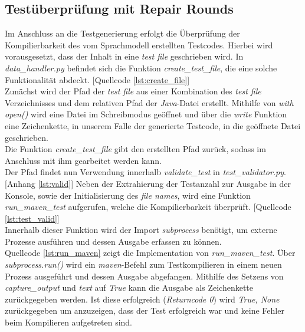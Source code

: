 \subsection{Testüberprüfung mit Repair Rounds}
Im Anschluss an die Testgenerierung erfolgt die Überprüfung der Kompilierbarkeit des vom Sprachmodell erstellten Testcodes. Hierbei wird vorausgesetzt, dass der Inhalt in eine \textit{test file} geschrieben wird. In \textit{data\_handler.py} befindet sich die Funktion \textit{create\_test\_file}, die eine solche Funktionalität abdeckt. [Quellcode \ref{lst:create_file}]\\
Zunächst wird der Pfad der \textit{test file} aus einer Kombination des \textit{test file} Verzeichnisses und dem relativen Pfad der \textit{Java}-Datei erstellt. Mithilfe von \textit{with open()} wird eine Datei im Schreibmodus geöffnet und über die \textit{write} Funktion eine Zeichenkette, in unserem Falle der generierte Testcode, in die geöffnete Datei geschrieben. \\Die Funktion \textit{create\_test\_file} gibt den erstellten Pfad zurück, sodass im Anschluss mit ihm gearbeitet werden kann.\\[0.4cm] 
\vspace{-.3cm}
Der Pfad findet nun Verwendung innerhalb \textit{validate\_test} in \textit{test\_validator.py}. [Anhang \ref{lst:valid}] Neben der Extrahierung der Testanzahl zur Ausgabe in der Konsole, sowie der Initialisierung des \textit{file names}, wird eine Funktion \textit{run\_maven\_test} aufgerufen, welche die Kompilierbarkeit überprüft. [Quellcode \ref{lst:test_valid}] \\Innerhalb dieser Funktion wird der Import \textit{subprocess} benötigt, um externe Prozesse ausführen und dessen Ausgabe erfassen zu können. \\
\vspace{-.3cm}
Quellcode \ref{lst:run_maven} zeigt die Implementation von \textit{run\_maven\_test}. Über \textit{subprocess.run()} wird ein \textit{maven}-Befehl zum Testkompilieren in einem neuen Prozess ausgeführt und dessen Ausgabe abgefangen.
Mithilfe des Setzens von \textit{capture\_output} und \textit{text} auf \textit{True} kann die Ausgabe als Zeichenkette zurückgegeben werden. Ist diese erfolgreich (\textit{Returncode 0}) wird \textit{True, None} zurückgegeben um anzuzeigen, dass der Test erfolgreich war und keine Fehler beim Kompilieren aufgetreten sind.\\
